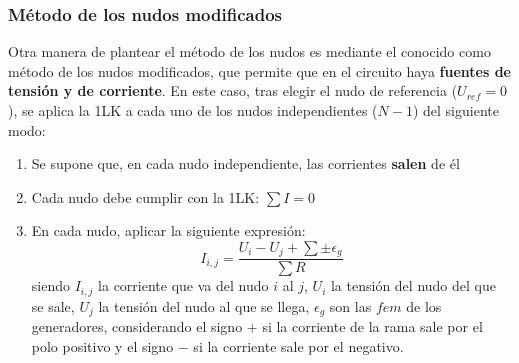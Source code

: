 \documentclass[11pt]{book} %
\begin{document}
	\subsubsection{Método de los nudos modificados}\label{sec.nudos_modificados}
	Otra manera de plantear el método de los nudos es mediante el conocido como método de los nudos modificados, que permite que en el circuito haya \textbf{fuentes de tensión y de corriente}. En este caso, tras elegir el nudo de referencia ($U_{ref}=0$), se aplica la 1LK a cada uno de los nudos independientes ($N-1$) del siguiente modo:
	\begin{enumerate}
	    \item Se supone que, en cada nudo independiente, las corrientes \textbf{salen} de él
	    \item Cada nudo debe cumplir con la 1LK: $\sum I=0$
	    \item En cada nudo, aplicar la siguiente expresión:
	    \begin{equation*}
	        I_{i,j}=\dfrac{U_i-U_j+\sum\pm \epsilon_g}{\sum R}
	    \end{equation*}
	    siendo $I_{i,j}$ la corriente que va del nudo $i$ al $j$, $U_i$ la tensión del nudo del que se sale, $U_j$ la tensión del nudo al que se llega, $\epsilon_g$ son las $fem$ de los generadores, considerando el signo $+$ si la corriente de la rama sale por el polo positivo y el signo $-$ si la corriente sale por el negativo.
	\end{enumerate}
	
\end{document}
